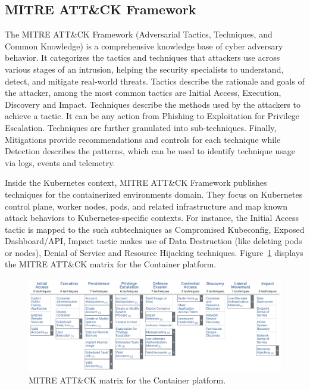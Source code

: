 \subsection{MITRE ATT\&CK Framework}

The MITRE ATT\&CK Framework (Adversarial Tactics, Techniques, and Common Knowledge) is a comprehensive knowledge base of cyber adversary behavior. It categorizes the tactics and techniques that attackers use across various stages of an intrusion, helping the security specialists to understand, detect, and mitigate real-world threats. Tactics describe the rationale and goals of the attacker, among the most common tactics are Initial Access, Execution, Discovery and Impact. Techniques describe the methods used by the attackers to achieve a tactic. It can be any action from Phishing to Exploitation for Privilege Escalation. Techniques are further granulated into sub-techniques. Finally, Mitigations provide recommendations and controls for each technique while Detection describes the patterns, which can be used to identify technique usage via logs, events and telemetry.

Inside the Kubernetes context, MITRE ATT\&CK Framework publishes techniques for the containerized environments domain. They focus on Kubernetes control plane, worker nodes, pods, and related infrastructure and map known attack behaviors to Kubernetes-specific contexts. For instance, the Initial Access tactic is mapped to the such subtechniques as Compromised Kubeconfig, Exposed Dashboard/API, Impact tactic makes use of Data Destruction (like deleting pods or nodes), Denial of Service and Resource Hijacking techniques. Figure~\ref{img:mitre-attack-matrix} displays the MITRE ATT\&CK matrix for the Container platform.

\begin{figure}[!hbt]
	\begin{center}
		\includegraphics[width=\textwidth]{images/mitre-attack-matrix.png}
        \caption{MITRE ATT\&CK matrix for the Container platform.}
		\label{img:mitre-attack-matrix}
	\end{center}
\end{figure}